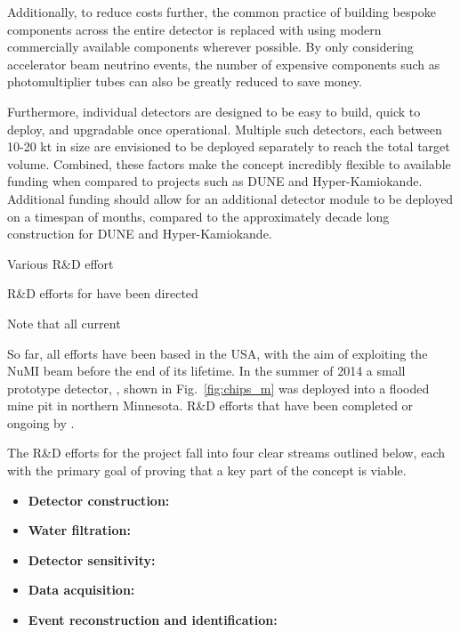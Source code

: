 Additionally, to reduce costs further, the common practice of building bespoke components across
the entire detector is replaced with using modern commercially available components wherever
possible. By only considering accelerator beam neutrino events, the number of expensive components
such as photomultiplier tubes can also be greatly reduced to save money.

Furthermore, individual \chips detectors are designed to be easy to build, quick to deploy, and
upgradable once operational. Multiple such detectors, each between 10-20 kt in size are envisioned
to be deployed separately to reach the total target volume. Combined, these factors make the
\chips concept incredibly flexible to available funding when compared to projects such as DUNE and
Hyper-Kamiokande. Additional funding should allow for an additional detector module to be deployed
on a timespan of months, compared to the approximately decade long construction for DUNE and
Hyper-Kamiokande.

Various R\&D effort

R\&D efforts for \chips have been directed

Note that all current

So far, all \chips efforts have been based in the USA, with the aim of exploiting the NuMI beam
before the end of its lifetime. In the summer of 2014 a small prototype detector, \chipsm, shown
in Fig.~\ref{fig:chips_m} was deployed into a flooded mine pit in northern Minnesota. R\&D efforts
that have been completed or ongoing by \chips.

The R\&D efforts for the \chips project fall into four clear streams outlined below, each with the
primary goal of proving that a key part of the \chips concept is viable.

\begin{itemize}
    \item \textbf{Detector construction:}
    \item \textbf{Water filtration:}
    \item \textbf{Detector sensitivity:}
    \item \textbf{Data acquisition:}
    \item \textbf{Event reconstruction and identification:}
\end{itemize}


